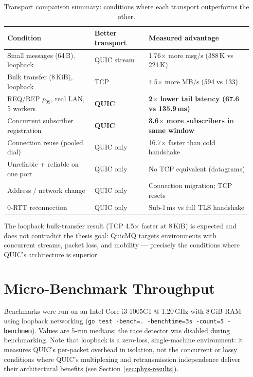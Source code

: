\documentclass[12pt, a4paper, oneside]{report}
\begin{document}
\begin{table}[H]
  \centering
  \caption{Transport comparison summary: conditions where each transport outperforms the other.}
  \label{tab:transport-summary}
  \begin{tabular}{lll}
    \toprule
    \textbf{Condition} & \textbf{Better transport} & \textbf{Measured advantage} \\
    \midrule
    Small messages (64\,B), loopback       & QUIC stream  & 1.76$\times$ more msg/s (388\,K vs 221\,K) \\
    Bulk transfer (8\,KiB), loopback       & TCP          & 4.5$\times$ more MB/s (594 vs 133) \\
    REQ/REP $p_{99}$, real LAN, 5 workers  & \textbf{QUIC}         & \textbf{2$\times$ lower tail latency (67.6 vs 135.9\,ms)} \\
    Concurrent subscriber registration     & \textbf{QUIC}         & \textbf{3.6$\times$ more subscribers in same window} \\
    Connection reuse (pooled dial)         & QUIC only    & 16.7$\times$ faster than cold handshake \\
    Unreliable + reliable on one port      & QUIC only    & No TCP equivalent (datagrams) \\
    Address / network change               & QUIC only    & Connection migration; TCP resets \\
    0-RTT reconnection                     & QUIC only    & Sub-1\,ms vs full TLS handshake \\
    \bottomrule
  \end{tabular}
\end{table}

The loopback bulk-transfer result (TCP 4.5$\times$ faster at 8\,KiB) is expected and does not contradict the thesis goal: QuicMQ targets environments with concurrent streams, packet loss, and mobility — precisely the conditions where QUIC's architecture is superior.

\section{Micro-Benchmark Throughput}
\label{sec:throughput}

Benchmarks were run on an Intel Core i3-1005G1 @ 1.20\,GHz with 8\,GiB RAM using loopback networking (\texttt{go test -bench=. -benchtime=3s -count=5 -benchmem}).
Values are 5-run medians; the race detector was disabled during benchmarking.
Note that loopback is a zero-loss, single-machine environment: it measures QUIC's per-packet overhead in isolation, not the concurrent or lossy conditions where QUIC's multiplexing and retransmission independence deliver their architectural benefits (see Section~\ref{sec:phys-results}).
\end{document}
